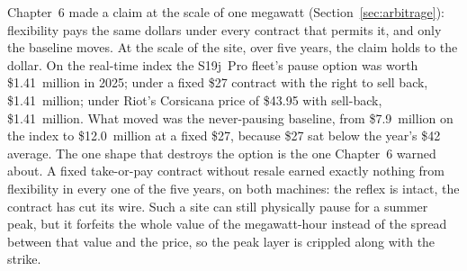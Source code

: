 Chapter~6 made a claim at the scale of one megawatt (Section~\ref{sec:arbitrage}): flexibility pays the same dollars under every contract that permits it, and only the baseline moves. At the scale of the site, over five years, the claim holds to the dollar. On the real-time index the S19j~Pro fleet's pause option was worth \$1.41~million in 2025; under a fixed \$27 contract with the right to sell back, \$1.41~million; under Riot's Corsicana price of \$43.95 with sell-back, \$1.41~million. What moved was the never-pausing baseline, from \$7.9~million on the index to \$12.0~million at a fixed \$27, because \$27 sat below the year's \$42 average. %
The one shape that destroys the option is the one Chapter~6 warned about. A fixed take-or-pay contract without resale earned exactly nothing from flexibility in every one of the five years, on both machines: the reflex is intact, the contract has cut its wire. %
Such a site can still physically pause for a summer peak, but it forfeits the whole value of the megawatt-hour instead of the spread between that value and the price, so the peak layer is crippled along with the strike.

